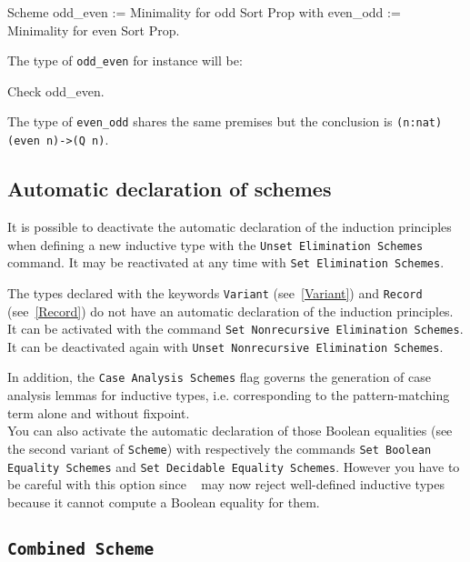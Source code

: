 \begin{coq_example}
Scheme odd_even := Minimality for   odd Sort Prop
  with even_odd := Minimality for even Sort Prop.
\end{coq_example}

The type of {\tt odd\_even} for instance will be:

\begin{coq_example}
Check odd_even.
\end{coq_example}

The type of {\tt even\_odd} shares the same premises but the
conclusion is {\tt (n:nat)(even n)->(Q n)}.

\subsection{Automatic declaration of schemes
\label{set-nonrecursive-elimination-schemes}
}

It is possible to deactivate the automatic declaration of the induction
 principles when defining a new inductive type  with the
 {\tt Unset Elimination Schemes} command. It may be
reactivated at any time with {\tt Set Elimination Schemes}.

The types declared with the keywords {\tt Variant} (see~\ref{Variant})
and {\tt Record} (see~\ref{Record}) do not have an automatic
declaration of the induction principles. It can be activated with the
command {\tt Set Nonrecursive Elimination Schemes}. It can be
deactivated again with {\tt Unset Nonrecursive Elimination Schemes}.

In addition, the {\tt Case Analysis Schemes} flag governs the generation of
case analysis lemmas for inductive types, i.e. corresponding to the
pattern-matching term alone and without fixpoint.
\\

You can also activate the automatic declaration of those Boolean equalities
(see the second variant of {\tt Scheme})
with respectively the commands {\tt Set Boolean Equality Schemes} and
{\tt Set Decidable Equality Schemes}.
However you have to be careful with this option since
\Coq~ may now reject well-defined inductive types because it cannot compute
a Boolean equality for them.

\subsection{\tt Combined Scheme}
\label{CombinedScheme}

